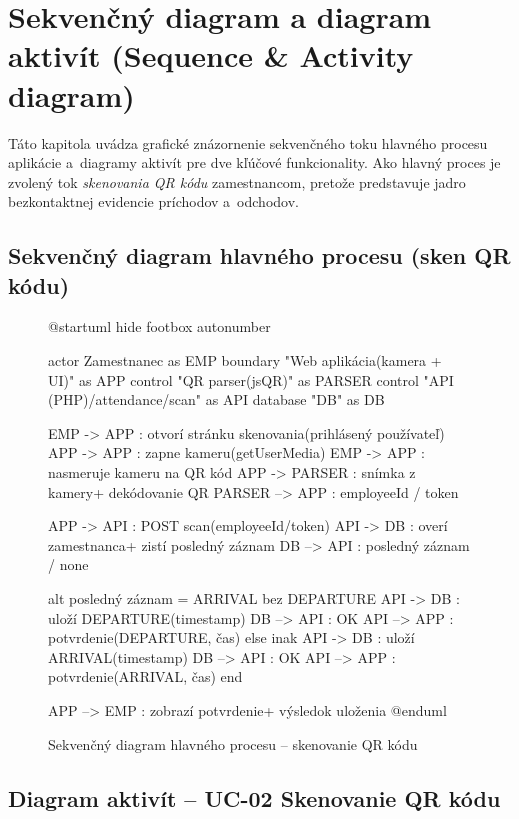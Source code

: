 \section{Sekvenčný diagram a diagram aktivít (Sequence \& Activity diagram)}

Táto kapitola uvádza grafické znázornenie sekvenčného toku hlavného procesu aplikácie a~diagramy
aktivít pre dve kľúčové funkcionality. Ako hlavný proces je zvolený tok \textit{skenovania QR kódu}
zamestnancom, pretože predstavuje jadro bezkontaktnej evidencie príchodov a~odchodov.

\subsection{Sekvenčný diagram hlavného procesu (sken QR kódu)}

\begin{figure}[H]
\centering
{}
\begin{plantuml}
@startuml
hide footbox
autonumber

actor Zamestnanec as EMP
boundary "Web aplikácia\n(kamera + UI)" as APP
control "QR parser\n(jsQR)" as PARSER
control "API (PHP)\n/attendance/scan" as API
database "DB" as DB

EMP -> APP : otvorí stránku skenovania\n(prihlásený používateľ)
APP -> APP : zapne kameru\n(getUserMedia)
EMP -> APP : nasmeruje kameru na QR kód
APP -> PARSER : snímka z kamery\n+ dekódovanie QR
PARSER --> APP : employeeId / token

APP -> API : POST scan(employeeId/token)
API -> DB : overí zamestnanca\n+ zistí posledný záznam
DB --> API : posledný záznam / none

alt posledný záznam = ARRIVAL bez DEPARTURE
  API -> DB : uloží DEPARTURE(timestamp)
  DB --> API : OK
  API --> APP : potvrdenie\n(DEPARTURE, čas)
else inak
  API -> DB : uloží ARRIVAL(timestamp)
  DB --> API : OK
  API --> APP : potvrdenie\n(ARRIVAL, čas)
end

APP --> EMP : zobrazí potvrdenie\n+ výsledok uloženia
@enduml
\end{plantuml}
\caption{Sekvenčný diagram hlavného procesu – skenovanie QR kódu}\label{o:seq-main-scan}
\end{figure}

\subsection{Diagram aktivít – UC-02 Skenovanie QR kódu}

